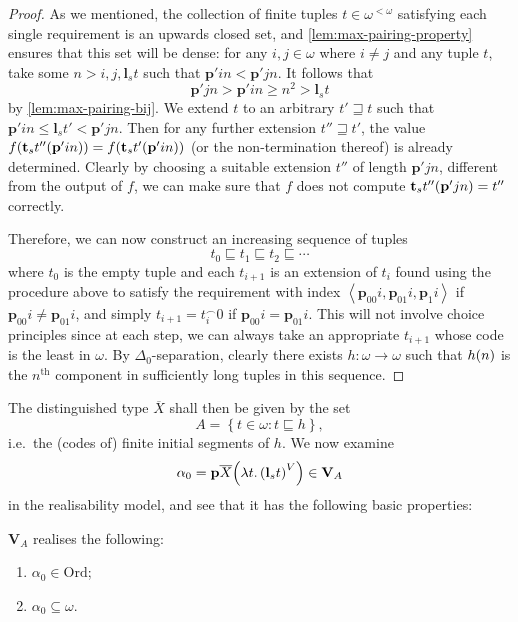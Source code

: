 \documentclass[12pt,openany]{book}
\theoremstyle{plain}
\theoremstyle{definition}
\newcommand\uplabel[1]{\textup{(#1)}}
\newcommand\tuple[1]{\left\langle #1 \right\rangle}
\newcommand\oplam[1]{\mathop{\lambda #1.}}
\newcommand\Ord{\mathrm{Ord}}
\newcommand\bp{\mathbf{p}}
\newcommand\bl{\mathbf{l}}
\newcommand\bt{\mathbf{t}}
\newcommand\bV{\mathbf{V}}
\begin{document}
\begin{proof}
  As we mentioned, the collection of finite tuples $t \in \omega^{< \omega}$ satisfying each single requirement is an upwards closed set, and \autoref{lem:max-pairing-property} ensures that this set will be dense: for any $i, j \in \omega$ where $i \neq j$ and any tuple $t$, take some $n > i, j, \bl_s t$ such that $\bp' in < \bp' jn$. It follows that
  \[\bp' jn > \bp' in \geq n^2 > \bl_s t\]
  by \autoref{lem:max-pairing-bij}. We extend $t$ to an arbitrary $t' \sqsupseteq t$ such that $\bp' in \leq \bl_s t' < \bp' jn$. Then for any further extension $t'' \sqsupseteq t'$, the value $f \mleft(\bt_s t'' \mleft(\bp' in\mright)\mright) = f \mleft(\bt_s t' \mleft(\bp' in\mright)\mright)$ (or the non-termination thereof) is already determined. Clearly by choosing a suitable extension $t''$ of length $\bp' jn$, different from the output of $f$, we can make sure that $f$ does not compute $\bt_s t'' \mleft(\bp' jn\mright) = t''$ correctly.

  Therefore, we can now construct an increasing sequence of tuples
  \[t_0 \sqsubseteq t_1 \sqsubseteq t_2 \sqsubseteq \cdots\]
  where $t_0$ is the empty tuple and each $t_{i + 1}$ is an extension of $t_i$ found using the procedure above to satisfy the requirement with index $\tuple{\bp_{00} i, \bp_{01} i, \bp_1 i}$ if $\bp_{00} i \neq \bp_{01} i$, and simply $t_{i + 1} = t_i^\frown 0$ if $\bp_{00} i = \bp_{01} i$. This will not involve choice principles since at each step, we can always take an appropriate $t_{i + 1}$ whose code is the least in $\omega$. By $\Delta_0$-separation, clearly there exists $h : \omega \rightarrow \omega$ such that $h\mleft(n\mright)$ is the $n^\text{th}$ component in sufficiently long tuples in this sequence.
\end{proof}

The distinguished type $\overline{X}$ shall then be given by the set
\[A = \left\{t \in \omega : t \sqsubseteq h\right\},\]
i.e.\ the (codes of) finite initial segments of $h$. We now examine
\[\alpha_0 = \bp \overline{X} \mleft(\oplam{t} \left(\bl_s t\right)^V\mright) \in \bV_A\]
in the realisability model, and see that it has the following basic properties:
\begin{lemma}
  $\bV_A$ realises the following:
  \begin{enumerate}[label=\uplabel{\roman*}]
    \item \label{itm:mltt-incom-ord-basic-ord} $\alpha_0 \in \Ord$;
    \item \label{itm:mltt-incom-ord-basic-sub} $\alpha_0 \subseteq \omega$.
  \end{enumerate}
\end{lemma}
\end{document}
